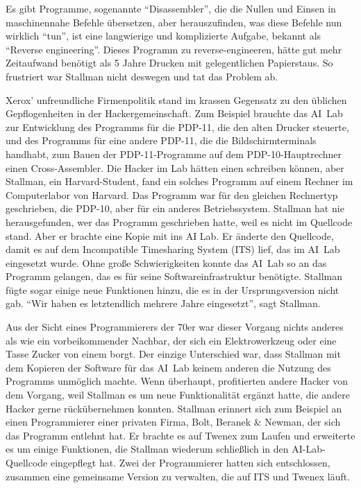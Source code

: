 Es gibt Programme, sogenannte "`Disassembler"', die die Nullen und Einsen in maschinennahe Befehle übersetzen, aber herauszufinden, was diese Befehle nun  wirklich "`tun"', ist eine langwierige und komplizierte Aufgabe, bekannt als "`Reverse engineering"'. Dieses Programm zu reverse-engineeren, hätte gut mehr Zeitaufwand benötigt als 5 Jahre Drucken mit gelegentlichen Papierstaus. So frustriert war Stallman nicht deswegen und tat das Problem ab. 

Xerox' unfreundliche Firmenpolitik stand im krassen Gegensatz zu den üblichen Gepflogenheiten in der Hackergemeinschaft. Zum Beispiel brauchte das AI~Lab zur Entwicklung des Programms für die PDP-11, die den alten Drucker steuerte, und des Programms für eine andere PDP-11, die die Bildschirmterminals handhabt, zum Bauen der PDP-11-Programme auf dem PDP-10-Hauptrechner einen Cross-Assembler. Die Hacker im Lab hätten einen schreiben können, aber Stallman, ein Harvard-Student, fand ein solches Programm auf einem Rechner im Computerlabor von Harvard. Das Programm war für den gleichen Rechnertyp geschrieben, die PDP-10, aber für ein anderes Betriebssystem. Stallman hat nie herausgefunden, wer das Programm geschrieben hatte, weil es nicht im Quellcode stand. Aber er brachte eine Kopie mit ins AI Lab. Er änderte den Quellcode, damit es auf dem Incompatible Timesharing System (ITS) lief, das im AI~Lab eingesetzt wurde. Ohne große Schwierigkeiten konnte das AI~Lab so an das Programm gelangen, das es für seine Softwareinfrastruktur benötigte. Stallman fügte sogar einige neue Funktionen hinzu, die es in der Ursprungsversion nicht gab. "`Wir haben es letztendlich mehrere Jahre eingesetzt"', sagt Stallman.

Aus der Sicht eines Programmierers der 70er war dieser Vorgang nichts anderes als wie ein vorbeikommender Nachbar, der sich ein Elektrowerkzeug oder eine Tasse Zucker von einem borgt. Der einzige Unterschied war, dass Stallman mit dem Kopieren der Software für das AI~Lab keinem anderen die Nutzung des Programms unmöglich machte. Wenn überhaupt, profitierten andere Hacker von dem Vorgang, weil Stallman es um neue Funktionalität ergänzt hatte, die andere Hacker gerne rückübernehmen konnten. Stallman erinnert sich zum Beispiel an einen Programmierer einer privaten Firma, Bolt, Beranek \& Newman, der sich das Programm entlehnt hat. Er brachte es auf Twenex zum Laufen und erweiterte es um einige Funktionen, die Stallman wiederum schließlich in den AI-Lab-Quellcode eingepflegt hat. Zwei der Programmierer hatten sich entschlossen, zusammen eine gemeinsame Version zu verwalten, die auf ITS und Twenex läuft.

